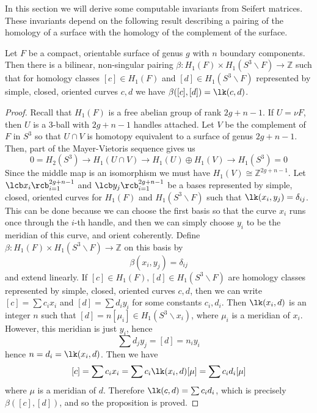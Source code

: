 In this section we will derive some computable invariants from Seifert matrices. These invariants depend on the following result describing a pairing of the homology of a surface with the homology of the complement of the surface.
\begin{prop}
\label{pairing of H_1(F) and H_1(S^3 - F)}
Let $F$ be a compact, orientable surface of genus $g$ with $n$ boundary components. Then there is a bilinear, non-singular pairing $\beta : H_1(F) \times H_1(S^3 \backslash F) \rightarrow \mathbb Z$ such that for homology classes $[c] \in H_1(F)$ and $[d] \in H_1(S^3 \backslash F)$ represented by simple, closed, oriented curves $c,d$ we have $\beta([c],[d])=\lk(c,d)$.
\end{prop}
\begin{proof}
Recall that $H_1(F)$ is a free abelian group of rank $2g+n-1$. If $U = \nu F$, then $U$ is a 3-ball with $2g+n-1$ handles attached. Let $V$ be the complement of $F$ in $S^3$ so that $U \cap V$ is homotopy equivalent to a surface of genus $2g+n-1$. Then, part of the Mayer-Vietoris sequence gives us
\[ 0 = H_2(S^3) \longrightarrow H_1(U \cap V) \longrightarrow H_1(U) \oplus H_1(V) \longrightarrow H_1(S^3) = 0 \]
Since the middle map is an isomorphism we must have $H_1(V) \cong \mathbb Z^{2g+n-1}$. Let $\lcb x_i \rcb_{i=1}^{2g+n-1}$ and $\lcb y_j \rcb_{i=1}^{2g+n-1}$ be a bases represented by simple, closed, oriented curves for $H_1(F)$ and $H_1(S^3 \backslash F)$ such that $\lk(x_i,y_j) = \delta_{ij}$. This can be done because we can choose the first basis so that the curve $x_i$ runs once through the $i$-th handle, and then we can simply choose $y_i$ to be the meridian of this curve, and orient coherently. Define $\beta : H_1(F) \times H_1(S^3 \backslash F) \rightarrow \mathbb Z$ on this basis by
\[ \beta(x_i,y_j) = \delta_{ij} \]
and extend linearly. If $[c] \in H_1(F), [d] \in H_1(S^3 \backslash F)$ are homology classes represented by simple, closed, oriented curves $c,d$, then we can write $[c] = \sum c_i x_i$ and $[d] = \sum d_i y_i$ for some constants $c_i,d_i$. Then $\lk(x_i,d)$ is an integer $n$ such that $[d]=n[\mu_i] \in H_1(S^3 \backslash x_i)$, where $\mu_i$ is a meridian of $x_i$. However, this meridian is just $y_i$, hence
\[ \sum d_j y_j = [d] = n_i y_i \]
hence $n = d_i = \lk(x_i,d)$. Then we have
\[ [c] = \sum c_i x_i = \sum c_i \lk(x_i,d) [\mu] = \sum c_i d_i [\mu] \]
where $\mu$ is a meridian of $d$. Therefore $\lk(c,d)=\sum c_i d_i$, which is precisely $\beta([c],[d])$, and so the proposition is proved.
\end{proof}

